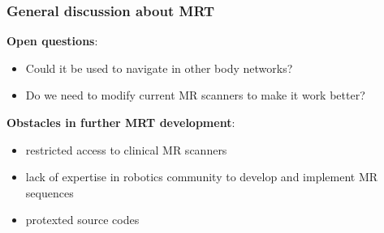 \documentclass[8pt,xcolor=table]{beamer}
\begin{document}
\begin{frame}
\frametitle{General discussion about MRT}

\textbf{Open questions}:
\begin{itemize}
\item Could it be used to navigate in other body networks?
\item Do we need to modify current MR scanners to make it work better?
\end{itemize}

\vfill

\textbf{Obstacles in further MRT development}:
\begin{itemize}
 \item restricted access to clinical MR scanners
 \item lack of expertise in robotics community to develop and implement MR sequences
 \item protexted source codes
\end{itemize}




\end{frame}
\end{document}
